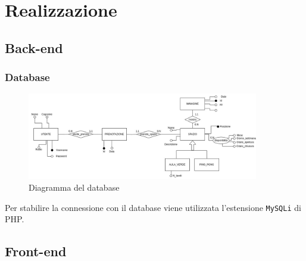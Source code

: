 \section{Realizzazione}

\subsection{Back-end}

\subsubsection{Database}

\begin{figure}[H]
	\centering
	\includegraphics[width=0.9\textwidth]{figures/Database}
	\caption{Diagramma del database}
\end{figure}

Per stabilire la connessione con il database viene utilizzata l'estensione
\texttt{MySQLi} di PHP.

\subsection{Front-end}
